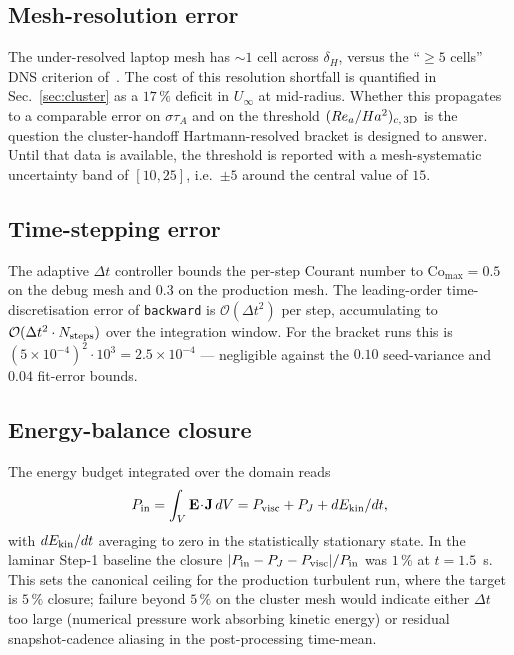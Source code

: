 \documentclass[aps,prl,twocolumn,superscriptaddress]{revtex4-2}
\begin{document}
\subsection{Mesh-resolution error}

The under-resolved laptop mesh has $\sim\!1$ cell across $\delta_H$,
versus the ``$\ge 5$ cells'' DNS criterion of~\cite{2}.  The cost of
this resolution shortfall is quantified in Sec.~\ref{sec:cluster}
as a $17\,\%$ deficit in $U_\infty$ at mid-radius.  Whether this
propagates to a comparable error on $\sigma\tau_A$ and on the
threshold $(Re_a/Ha^{2})_{c,\,\rm 3D}$ is the question the
cluster-handoff Hartmann-resolved bracket is designed to answer.
Until that data is available, the threshold is reported with a
mesh-systematic uncertainty band of $[10, 25]$, i.e.\
$\pm 5$ around the central value of $15$.

\subsection{Time-stepping error}

The adaptive $\Delta t$ controller bounds the per-step Courant number
to $\mathrm{Co}_{\max} = 0.5$ on the debug mesh and $0.3$ on the
production mesh.  The leading-order time-discretisation error of
\texttt{backward} is $\mathcal{O}(\Delta t^{2})$ per step,
accumulating to $\mathcal{O}(\Delta t^{2}\cdot N_{\rm steps})$ over
the integration window.  For the bracket runs this is
$(5\!\times\!10^{-4})^{2}\!\cdot\!10^{3} = 2.5\!\times\!10^{-4}$ ---
negligible against the $0.10$ seed-variance and $0.04$ fit-error
bounds.

\subsection{Energy-balance closure}

The energy budget integrated over the domain reads
\begin{equation}
P_{\rm in} = \int_V \mathbf{E}\!\cdot\!\mathbf{J}\,dV =
   P_{\rm visc} + P_J + dE_{\rm kin}/dt,
\label{eq:enbalance}
\end{equation}
with $dE_{\rm kin}/dt$ averaging to zero in the statistically
stationary state.  In the laminar Step-1 baseline the closure
$|P_{\rm in} - P_J - P_{\rm visc}|/P_{\rm in}$ was $1\,\%$ at
$t = 1.5$~s.  This sets the canonical ceiling for the production
turbulent run, where the target is $5\,\%$ closure; failure beyond
$5\,\%$ on the cluster mesh would indicate either $\Delta t$ too
large (numerical pressure work absorbing kinetic energy) or residual
snapshot-cadence aliasing in the post-processing time-mean.
\end{document}
